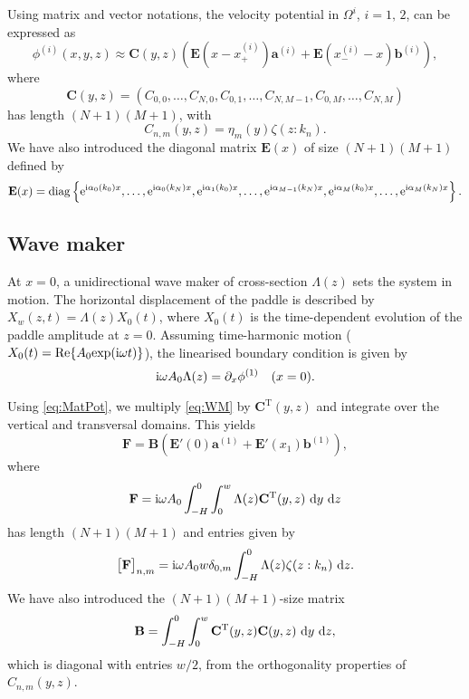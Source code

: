\documentclass[12pt,a4paper]{article}
\newcommand{\vp}{{\phi}}
\newcommand{\vm}{{\zeta}}
\newcommand{\ym}{{\eta}}
\newcommand{\kx}{\alpha}
\begin{document}
Using matrix and vector notations, the velocity potential in $\Omega^{i}$, $i=1,\,2$, can be expressed as
\begin{equation}
  \label{eq:MatPot}
 \vp^{(i)}(x,y,z) \approx \mathbf{C}(y,z)\left(\mathbf{E}(x-x^{(i)}_+)\mathbf{a}^{(i)} + 
 \mathbf{E}(x^{(i)}_--x)\mathbf{b}^{(i)}\right),
\end{equation}
where
\[
  \mathbf{C}(y,z) = \left(C_{0,0},\ldots,C_{N,0},C_{0,1},\ldots,C_{N,M-1},C_{0,M},\ldots,C_{N,M}\right)
\]
has length $(N+1)(M+1)$, with 
\[
  C_{n,m}(y,z) = \ym_{m}(y) \vm(z:k_{n}).
\]
We have also introduced the diagonal matrix $\mathbf{E}(x)$ of size $(N+1)(M+1)$ defined by
\[
  \mathbf{E}(x) = \mathrm{diag}\left\{\exp^{\ci\kx_{0}(k_{0})x},\ldots,\exp^{\ci\kx_{0}(k_{N})x},
  \exp^{\ci\kx_{1}(k_{0})x},\ldots,\exp^{\ci\kx_{M-1}(k_{N})x},\exp^{\ci\kx_{M}(k_{0})x},\ldots,
  \exp^{\ci\kx_{M}(k_{N})x}\right\}.
\]


\subsection{Wave maker}

At $x=0$, a unidirectional wave maker of cross-section $\Lambda(z)$ sets the system in motion. The 
horizontal displacement of the paddle is described by $X_w(z,t)=\Lambda(z)X_0(t)$, where $X_0(t)$ is the 
time-dependent evolution of the paddle amplitude at $z = 0$. Assuming time-harmonic motion (\ie 
$X_0(t) = \textrm{Re}\{A_0\mathrm{exp}({\mathrm i}\omega t)\}$), the linearised 
boundary condition is given by
\begin{equation}
  \label{eq:WM}
  \ci \omega A_0 \Lambda(z) = \partial_x \vp^{(1)} \quad (x=0).
\end{equation}

Using \eqref{eq:MatPot}, we multiply \eqref{eq:WM} by $\mathbf{C}^{\mathrm{T}}(y,z)$ and integrate over the 
vertical and transversal domains. This yields
\begin{equation}
  \label{eq:WM_proj}
  \mathbf{F} = \mathbf{B}\left(\mathbf{E}'(0)\mathbf{a}^{(1)} + \mathbf{E}'(x_1)\mathbf{b}^{(1)}\right),
\end{equation}
where
\[
  \mathbf{F} = {\mathrm i} \omega A_0 \int_{-H}^0 \int_0^w \Lambda(z) \mathbf{C}^{\mathrm{T}}(y,z) ~ {\rm d} y ~ {\rm d} z
\]
has length $(N+1)(M+1)$ and entries given by 
\[
  \big[\mathbf{F}\big]_{n,m} = \ci \omega A_0 w \delta_{0,m} \int_{-H}^0 \Lambda(z) \vm(z:k_{n}) \wrt z.
\]
We have also introduced the $(N+1)(M+1)$-size matrix
\[
  \mathbf{B} = \int_{-H}^0 \int_0^w \mathbf{C}^{\mathrm{T}}(y,z) \mathbf{C}(y,z) ~ {\rm d} y ~ {\rm d} z,
\]
which is diagonal with entries $w/2$, from the orthogonality properties of $C_{n,m}(y,z)$.
\end{document}
